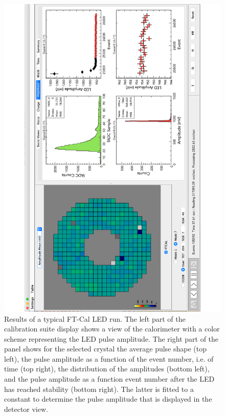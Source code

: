 \begin{figure}
\includegraphics[height=1.0\columnwidth,angle=270]{fig/ftcal_ledrun.pdf}
\caption{Results of a typical FT-Cal LED run. The left part of the calibration suite display shows a view of the
  calorimeter with a color scheme representing the LED pulse amplitude. The right part of the panel shows for the
  selected crystal the average pulse shape (top left), the pulse amplitude as a function of the event number, i.e. of
  time (top right), the distribution of the amplitudes (bottom left), and the pulse amplitude  as a function event number
  after the LED has reached stability (bottom right). The latter is fitted to a constant to determine the pulse
  amplitude that is displayed in the detector view.}
\label{fig:ftcal_ledrun}
\end{figure}

